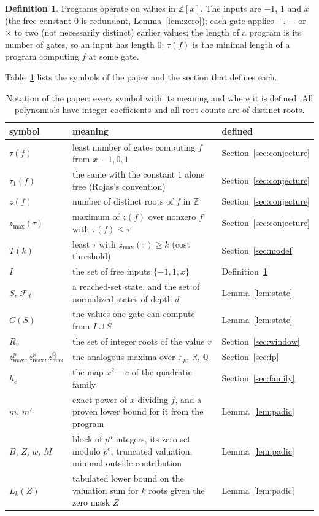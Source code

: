 \documentclass[11pt]{article}
\theoremstyle{definition}
\newtheorem{definition}[theorem]{Definition}
\theoremstyle{remark}
\newcommand{\Z}{\mathbb{Z}}
\newcommand{\zmax}{z_{\max}}
\newcommand{\zpmax}{z^{p}_{\max}}
\newcommand{\zrmax}{z^{\mathbb{R}}_{\max}}
\newcommand{\zqmax}{z^{\mathbb{Q}}_{\max}}
\begin{document}
\begin{definition}\label{def:model}
Programs operate on values in $\Z[x]$. The inputs are $-1$, $1$ and $x$ (the free constant $0$ is
redundant, Lemma~\ref{lem:zero}); each gate
applies $+$, $-$ or $\times$ to two (not necessarily distinct) earlier values; the
length of a program is its number of gates, so an input has length $0$; $\tau(f)$ is the minimal length of a
program computing $f$ at some gate.
\end{definition}

Table~\ref{tab:notation} lists the symbols of the paper and the section that defines each.

\begin{table}[t]
\centering
\small
\caption{Notation of the paper: every symbol with its meaning and where it is defined. All
polynomials have integer coefficients and all root counts are of distinct roots.}
\label{tab:notation}
\begin{tabular}{@{}l>{\raggedright\arraybackslash}p{9.3cm}l@{}}
\toprule
symbol & meaning & defined\\
\midrule
$\tau(f)$ & least number of gates computing $f$ from $x, -1, 0, 1$ & Section~\ref{sec:conjecture}\\
$\tau_1(f)$ & the same with the constant $1$ alone free (Rojas's convention) & Section~\ref{sec:conjecture}\\
$z(f)$ & number of distinct roots of $f$ in $\Z$ & Section~\ref{sec:conjecture}\\
$\zmax(\tau)$ & maximum of $z(f)$ over nonzero $f$ with $\tau(f) \le \tau$ & Section~\ref{sec:conjecture}\\
$T(k)$ & least $\tau$ with $\zmax(\tau) \ge k$ (cost threshold) & Section~\ref{sec:model}\\
$I$ & the set of free inputs $\{-1, 1, x\}$ & Definition~\ref{def:model}\\
$S$, $\mathcal{F}_d$ & a reached-set state, and the set of normalized states of depth $d$ & Lemma~\ref{lem:state}\\
$C(S)$ & the values one gate can compute from $I \cup S$ & Lemma~\ref{lem:state}\\
$R_v$ & the set of integer roots of the value $v$ & Section~\ref{sec:window}\\
$\zpmax, \zrmax, \zqmax$ & the analogous maxima over $\mathbb{F}_p$, $\mathbb{R}$, $\mathbb{Q}$ & Section~\ref{sec:fp}\\
$h_c$ & the map $x^2 - c$ of the quadratic family & Section~\ref{sec:family}\\
$m$, $m'$ & exact power of $x$ dividing $f$, and a proven lower bound for it from the program & Lemma~\ref{lem:padic}\\
$B$, $Z$, $w$, $M$ & block of $p^a$ integers, its zero set modulo $p^e$, truncated valuation, minimal outside contribution & Lemma~\ref{lem:padic}\\
$L_k(Z)$ & tabulated lower bound on the valuation sum for $k$ roots given the zero mask $Z$ & Lemma~\ref{lem:padic}\\
\bottomrule
\end{tabular}
\end{table}
\end{document}
